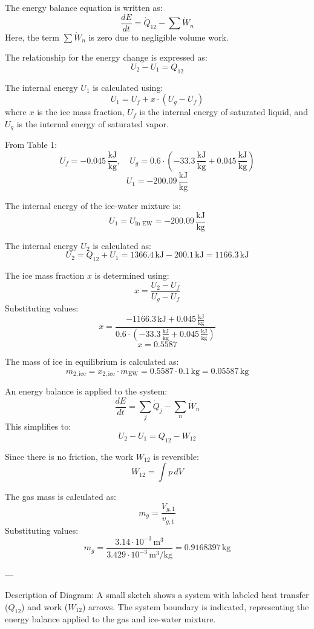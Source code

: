 The energy balance equation is written as:
\[
\frac{dE}{dt} = \dot{Q}_{12} - \sum \dot{W}_n
\]
Here, the term \( \sum \dot{W}_n \) is zero due to negligible volume work.

The relationship for the energy change is expressed as:
\[
U_2 - U_1 = Q_{12}
\]

The internal energy \( U_1 \) is calculated using:
\[
U_1 = U_f + x \cdot (U_g - U_f)
\]
where \( x \) is the ice mass fraction, \( U_f \) is the internal energy of saturated liquid, and \( U_g \) is the internal energy of saturated vapor.

From Table 1:
\[
U_f = -0.045 \, \frac{\text{kJ}}{\text{kg}}, \quad U_g = 0.6 \cdot (-33.3 \, \frac{\text{kJ}}{\text{kg}} + 0.045 \, \frac{\text{kJ}}{\text{kg}})
\]
\[
U_1 = -200.09 \, \frac{\text{kJ}}{\text{kg}}
\]

The internal energy of the ice-water mixture is:
\[
U_1 = U_{\text{in EW}} = -200.09 \, \frac{\text{kJ}}{\text{kg}}
\]

The internal energy \( U_2 \) is calculated as:
\[
U_2 = Q_{12} + U_1 = 1366.4 \, \text{kJ} - 200.1 \, \text{kJ} = 1166.3 \, \text{kJ}
\]

The ice mass fraction \( x \) is determined using:
\[
x = \frac{U_2 - U_f}{U_g - U_f}
\]
Substituting values:
\[
x = \frac{-1166.3 \, \text{kJ} + 0.045 \, \frac{\text{kJ}}{\text{kg}}}{0.6 \cdot (-33.3 \, \frac{\text{kJ}}{\text{kg}} + 0.045 \, \frac{\text{kJ}}{\text{kg}})}
\]
\[
x = 0.5587
\]

The mass of ice in equilibrium is calculated as:
\[
m_{2,\text{ice}} = x_{2,\text{ice}} \cdot m_{\text{EW}} = 0.5587 \cdot 0.1 \, \text{kg} = 0.05587 \, \text{kg}
\]

An energy balance is applied to the system:  
\[
\frac{dE}{dt} = \sum_j \dot{Q}_j - \sum_n \dot{W}_n
\]
This simplifies to:  
\[
U_2 - U_1 = Q_{12} - W_{12}
\]

Since there is no friction, the work \( W_{12} \) is reversible:  
\[
W_{12} = \int p \, dV
\]

The gas mass is calculated as:  
\[
m_g = \frac{V_{g,1}}{v_{g,1}}
\]
Substituting values:  
\[
m_g = \frac{3.14 \cdot 10^{-3} \, \text{m}^3}{3.429 \cdot 10^{-3} \, \text{m}^3/\text{kg}} = 0.9168397 \, \text{kg}
\]

---

Description of Diagram:  
A small sketch shows a system with labeled heat transfer (\( Q_{12} \)) and work (\( W_{12} \)) arrows. The system boundary is indicated, representing the energy balance applied to the gas and ice-water mixture.